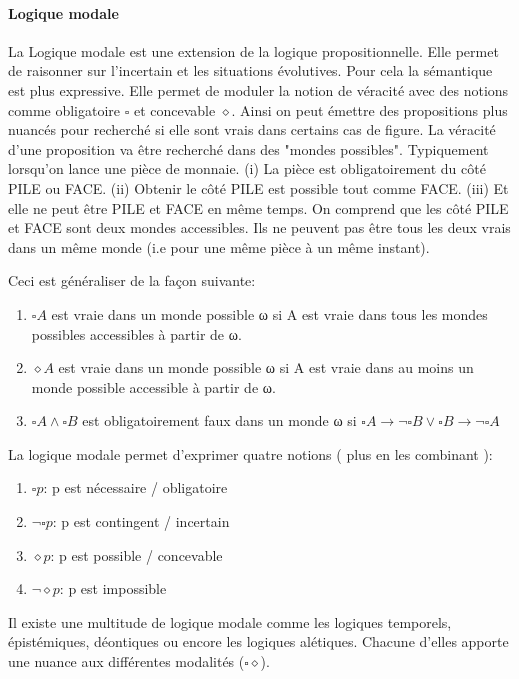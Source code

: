 \begin{refsegment}
    \paragraph{Logique modale}
    La Logique modale est une extension de la logique propositionnelle. Elle permet de raisonner sur l'incertain et les situations évolutives. Pour cela la sémantique est plus expressive. Elle permet de moduler la notion de véracité avec des notions comme obligatoire $\square$ et concevable $\diamond$. Ainsi on peut émettre des propositions plus nuancés pour recherché si elle sont vrais dans certains cas de figure. La véracité d'une proposition va être recherché dans des "mondes possibles". Typiquement lorsqu'on lance une pièce de monnaie. (i) La pièce est obligatoirement du côté PILE ou FACE. (ii) Obtenir le côté PILE est possible tout comme FACE. (iii) Et elle ne peut être PILE et FACE en même temps. On comprend que les côté PILE et FACE sont deux mondes accessibles. Ils ne peuvent pas être tous les deux vrais dans un même monde (i.e pour une même pièce à un même instant).
    
    Ceci est généraliser de la façon suivante:\nolisttopbreak
    \begin{enumerate}[label=\roman*)]
        \item $\square A$ est vraie dans un monde possible ω si A est vraie dans tous les mondes possibles accessibles à partir de ω.
        \item $\diamond A$ est vraie dans un monde possible ω si A est vraie dans au moins un monde possible accessible à partir de ω.
        \item $\square A \land \square B$ est obligatoirement faux dans un monde ω si $\square A \to \lnot \square B \lor \square B \to \lnot\square A$
    \end{enumerate}

    La logique modale permet d'exprimer quatre notions ( plus en les combinant ):
    \begin{enumerate}[label={}]
        \item $\square p$: p est nécessaire / obligatoire
        \item $\lnot\square p$: p est contingent / incertain
        \item $\diamond p$: p est possible / concevable
        \item $\lnot \diamond p$: p est impossible
    \end{enumerate}

    Il existe une multitude de logique modale comme les logiques temporels, épistémiques, déontiques ou encore les logiques alétiques. Chacune d'elles apporte une nuance aux différentes modalités ($\square \diamond$).
    

\end{refsegment}
